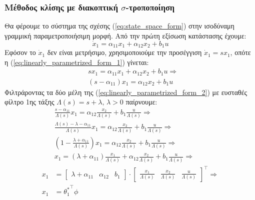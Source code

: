 \documentclass[a4paper,12pt]{article}
\begin{document}
\subsubsection*{Mέθοδος κλίσης με διακοπτική $\sigma$-τροποποίηση}

Θα φέρουμε το σύστημα της σχέσης (\ref{eq:state_space_form}) στην ισοδύναμη γραμμική παραμετροποιήσιμη 
μορφή. Από την πρώτη εξίσωση κατάστασης έχουμε:
\begin{equation}
    \dot{x}_1 = \alpha_{11} x_1 + \alpha_{12} x_2 + b_1 u
    \label{eq:linearly_parametrized_form_1}
\end{equation}
Εφόσον το $\dot{x}_1$ δεν είναι μετρήσιμο, χρησιμοποιούμε την προσέγγιση $\dot{x}_1 = s x_1$, οπότε η
(\ref{eq:linearly_parametrized_form_1}) γίνεται:
\begin{equation}
    \begin{aligned}
        &s x_1 = \alpha_{11} x_1 + \alpha_{12} x_2 + b_1 u \Rightarrow \\ 
        &(s - \alpha_{11}) x_1 = \alpha_{12} x_2 + b_1 u
    \end{aligned}
    \label{eq:linearly_parametrized_form_2}
\end{equation}
Φιλτράροντας τα δύο μέλη της (\ref{eq:linearly_parametrized_form_2}) με ευσταθές φίλτρο 1ης τάξης
$\Lambda(s) = s + \lambda, \, \lambda > 0$ παίρνουμε:
\begin{equation*}
    \begin{aligned}
        &\frac{s - \alpha_{11}}{\Lambda(s)} x_1 = \alpha_{12} \frac{x_2}{\Lambda(s)} + 
        b_1 \frac{u}{\Lambda(s)} \Rightarrow \\
        &\frac{\Lambda(s) - \lambda - \alpha_{11}}{\Lambda(s)} x_1 = \alpha_{12} \frac{x_2}{\Lambda(s)} + 
        b_1 \frac{u}{\Lambda(s)} \Rightarrow \\
        &\left(1 - \frac{\lambda + \alpha_{11}}{\Lambda(s)}\right) x_1 = \alpha_{12} \frac{x_2}{\Lambda(s)} + 
        b_1 \frac{u}{\Lambda(s)} \Rightarrow \\
        &x_1 = (\lambda + \alpha_{11})\frac{x_1}{\Lambda(s)} + \alpha_{12} \frac{x_2}{\Lambda(s)} + 
        b_1 \frac{u}{\Lambda(s)} \Rightarrow \\
        x_1 &=
        \begin{bmatrix}
            \lambda + \alpha_{11} & \alpha_{12} & b_1
        \end{bmatrix} \cdot
        \begin{bmatrix}
            \frac{x_1}{\Lambda(s)} & \frac{x_2}{\Lambda(s)} & \frac{u}{\Lambda(s)}
        \end{bmatrix}^{\top} \Rightarrow \\
        x_1 &= {\theta_1^*}^{\top} \phi
    \end{aligned} 
\end{equation*}
\end{document}
